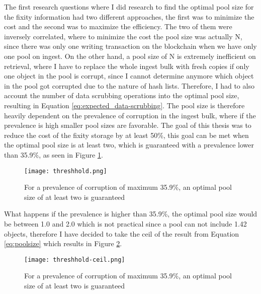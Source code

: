 The first research questions where I did research to find the optimal pool size for the fixity information had two different approaches, the first was to minimize the cost and the second was to maximize the efficiency. The two of them were inversely correlated, where to minimize the cost the pool size was actually N, since there was only one writing transaction on the blockchain when we have only one pool on ingest. On the other hand, a pool size of N is extremely inefficient on retrieval, where I have to replace the whole ingest bulk with fresh copies if only one object in the pool is corrupt, since I cannot determine anymore which object in the pool got corrupted due to the nature of hash lists. Therefore, I had to also account the number of data scrubbing operations into the optimal pool size, resulting in Equation \ref{eq:expected_data-scrubbing}. The pool size is therefore heavily dependent on the prevalence of corruption in the ingest bulk, where if the prevalence is high smaller pool sizes are favorable. The goal of this thesis was to reduce the cost of the fixity storage by at least 50\%, this goal can be met when the optimal pool size is at least two, which is guaranteed with a prevalence lower than 35.9\%, as seen in Figure \ref{fig:threshhold}.
\begin{figure}[h]
    \caption{For a prevalence of corruption of maximum 35.9\%, an optimal pool size of at least two is guaranteed}
    \label{fig:threshhold}
    \centering
    \texttt{[image: threshhold.png]}
\end{figure}
What happens if the prevalence is higher than 35.9\%, the optimal pool size would be between 1.0 and 2.0 which is not practical since a pool can not include 1.42 objects, therefore I have decided to take the ceil of the result from Equation \ref{eq:poolsize} which results in Figure \ref{fig:threshhold-ceil}.
\begin{figure}[h]
    \caption{For a prevalence of corruption of maximum 35.9\%, an optimal pool size of at least two is guaranteed}
    \label{fig:threshhold-ceil}
    \centering
    \texttt{[image: threshhold-ceil.png]}
\end{figure}

